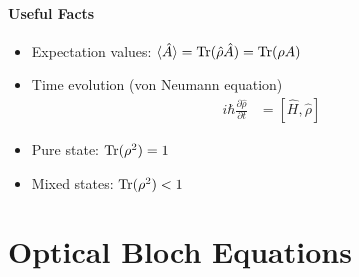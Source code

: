 \documentclass[../../note.tex]{subfiles}
\begin{document}
\paragraph{Useful Facts}
\begin{itemize}
    \item Expectation values: $\langle \hat{A} \rangle = \operatorname{Tr}(\hat{\rho} \hat{A}) = \operatorname{Tr}(\rho A)$
    \item Time evolution (von Neumann equation)
    \begin{align}
        i \hbar \frac{\partial \hat{\rho}}{\partial t} 
        &= [\hat{H}, \hat{\rho}]
    \end{align}
    \item Pure state:  $\operatorname{Tr}(\rho^2) = 1$
    \item Mixed states: $\operatorname{Tr}(\rho^2) < 1$
\end{itemize}

\section{Optical Bloch Equations}
\end{document}
